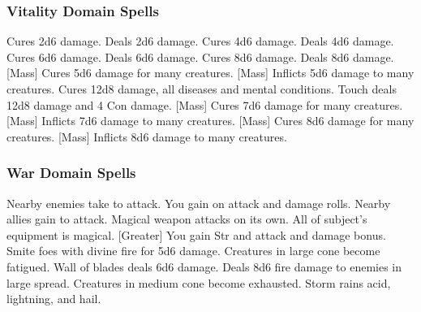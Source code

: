\subsubsection{Vitality Domain Spells}

\begin{spelllist}
     Cures 2d6 damage.
     Deals 2d6 damage.
     Cures 4d6 damage.
     Deals 4d6 damage.
     Cures 6d6 damage.
     Deals 6d6 damage.
     Cures 8d6 damage.
     Deals 8d6 damage.
    [Mass] Cures 5d6 damage for many creatures.
    [Mass] Inflicts 5d6 damage to many creatures.
     Cures 12d8 damage, all diseases and mental conditions.
     Touch deals 12d8 damage and 4 Con damage.
    [Mass] Cures 7d6 damage for many creatures.
    [Mass] Inflicts 7d6 damage to many creatures.
    [Mass] Cures 8d6 damage for many creatures.
    [Mass] Inflicts 8d6 damage to many creatures.
    \spellhead[9]{}
    \spellhead[9]{}
\end{spelllist}

\subsubsection{War Domain Spells}

\begin{spelllist}
     Nearby enemies take  to attack.
     You gain  on attack and damage rolls.
     Nearby allies gain  to attack.
     Magical weapon attacks on its own.
    \spellhead[3]{}
    \spellhead[3]{}
     All of subject's equipment is magical.
    [Greater] You gain  Str and attack and damage bonus.
     Smite foes with divine fire for 5d6 damage.
     Creatures in large cone become fatigued.
     Wall of blades deals 6d6 damage.
    \spellhead[6]{}
    \spellhead[7]{}
    \spellhead[7]{}
     Deals 8d6 fire damage to enemies in large spread.
     Creatures in medium cone become exhausted.  
    \spellhead[9]{}
     Storm rains acid, lightning, and hail.
\end{spelllist}

